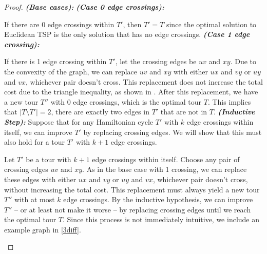 \begin{proof}
    
\textbf{\textit{(Base cases):}} \newline
\textbf{\textit{(Case 0 edge crossings):}}

If there are 0 edge crossings within $T'$, then $T' = T$ since the optimal solution to Euclidean TSP is the only solution that has no edge crossings.
\newline\textbf{\textit{(Case 1 edge crossing):}}

If there is 1 edge crossing within $T'$, let the crossing edges be $uv$ and $xy$. Due to the convexity of the graph, we can replace $uv$ and $xy$ with either $ux$ and $vy$ or $uy$ and $vx$, whichever pair doesn't cross. This replacement does not increase the total cost due to the triangle inequality, as shown in \cite{quintas1965on}. After this replacement, we have a new tour $T''$ with 0 edge crossings, which is the optimal tour $T$. This implies that $|T \setminus T'| = 2$, there are exactly two edges in $T'$ that are not in $T$.
\newline\textbf{\textit{(Inductive Step):}} Suppose that for any Hamiltonian cycle $T'$ with $k$ edge crossings within itself, we can improve $T'$ by replacing crossing edges. We will show that this must also hold for a tour $T'$ with $k+1$ edge crossings.

Let $T'$ be a tour with $k+1$ edge crossings within itself. Choose any pair of crossing edges $uv$ and $xy$. As in the base case with 1 crossing, we can replace these edges with either $ux$ and $vy$ or $uy$ and $vx$, whichever pair doesn't cross, without increasing the total cost. This replacement must always yield a new tour $T''$ with at most $k$ edge crossings. By the inductive hypothesis, we can improve $T''$ -- or at least not make it worse -- by replacing crossing edges until we reach the optimal tour $T$. Since this process is not immediately intuitive, we include an example graph in \autoref{3diff}.

\begin{figure}[!ht]
	\centering
\end{figure}
\end{proof}
